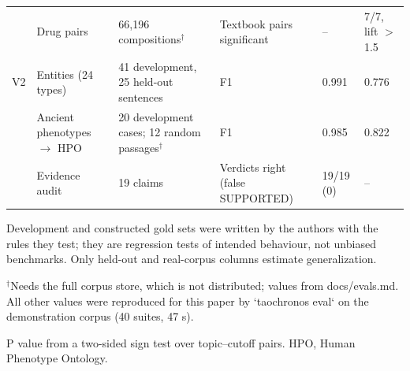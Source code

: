 \begin{table}[t]
\begin{tabular}{llllll}
 & Drug pairs & 66,196 compositions$^{\dagger}$ & Textbook pairs significant & – & 7/7, lift $>$ 1.5 \\
V2 & Entities (24 types) & 41 development, 25 held-out sentences & F1 & 0.991 & 0.776 \\
 & Ancient phenotypes $\rightarrow$ HPO & 20 development cases; 12 random passages$^{\dagger}$ & F1 & 0.985 & 0.822 \\
 & Evidence audit & 19 claims & Verdicts right (false SUPPORTED) & 19/19 (0) & – \\
\bottomrule
\end{tabular}
\par\footnotesize
Development and constructed gold sets were written by the authors with the rules they test; they are regression tests of intended behaviour, not unbiased benchmarks. Only held-out and real-corpus columns estimate generalization.\par
$^{\dagger}$Needs the full corpus store, which is not distributed; values from docs/evals.md. All other values were reproduced for this paper by `taochronos eval` on the demonstration corpus (40 suites, 47 s).\par
P value from a two-sided sign test over topic–cutoff pairs. HPO, Human Phenotype Ontology.\par
\end{table}
